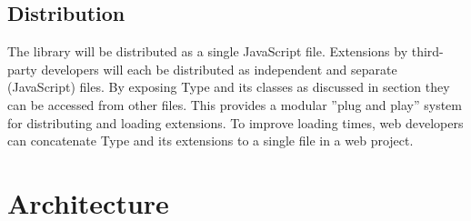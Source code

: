 

\section{Distribution}

The library will be distributed as a single JavaScript file. Extensions by third-party developers will each be distributed as independent and separate (JavaScript) files. By exposing Type and its classes as discussed in section  they can be accessed from other files. This provides a modular ''plug and play'' system for distributing and loading extensions. To improve loading times, web developers can concatenate Type and its extensions to a single file in a web project.








\chapter{Architecture}
\label{sec:impl_architecture}

